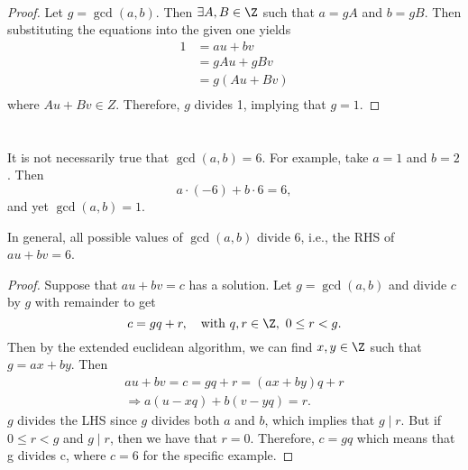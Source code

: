 \documentclass[
  coursecode={MTHE 418},
  assignmentname={Homework \homeworknumber},
  studentnumber=20053722,
  name={Bryan Hoang},
  draft,
]{
  ltxanswer%
}
\begin{document}
\begin{questions}
    \question\
    \begin{parts}
      \part{}
      \begin{solution}
        \begin{proof}
          Let \(g = \gcd(a,b)\). Then \(\exists A, B \in \Z\) such that \(a = gA\) and \(b = gB\). Then substituting the equations into the given one yields
          \begin{align*}
            1 &= au + bv    \\
              &= gAu + gBv  \\
              &= g(Au + Bv) \\
          \end{align*}
          where \(Au + Bv \in Z\). Therefore, \(g\) divides 1, implying that \(g = 1\).
        \end{proof}
      \end{solution}

      \part{}
      \begin{solution}
        It is not necessarily true that \(\gcd(a,b) = 6\). For example, take \(a = 1\) and \(b = 2\). Then
        \begin{equation*}
          a \cdot (-6) + b \cdot 6 = 6,
        \end{equation*}
        and yet \(\gcd(a,b) = 1\).

        \begin{claim}
          In general, all possible values of \(\gcd(a,b)\) divide 6, i.e., the RHS of \(au + bv = 6\).
        \end{claim}
        \begin{proof}
          Suppose that \(au + bv = c\) has a solution. Let \(g = \gcd(a,b)\) and divide \(c\) by \(g\) with remainder to get
          \begin{equation*}
            c = gq + r, \quad \text{with}\ q,r \in \Z,\ 0 \le r < g.
          \end{equation*}
          Then by the extended euclidean algorithm, we can find \(x,y \in \Z\) such that \(g = ax + by\). Then
          \begin{gather*}
            au + bv = c = gq + r = (ax + by)q + r \\
            \Rightarrow a(u - xq) + b(v - yq) = r.
          \end{gather*}
          \(g\) divides the LHS since \(g\) divides both \(a\) and \(b\), which implies that \(g \mid r\). But if \(0 \le r < g\) and \(g \mid r\), then we have that \(r = 0\). Therefore, \(c = gq\) which means that g divides c, where \(c = 6\) for the specific example.
        \end{proof}
      \end{solution}


\end{parts}
\end{questions}
\end{document}
